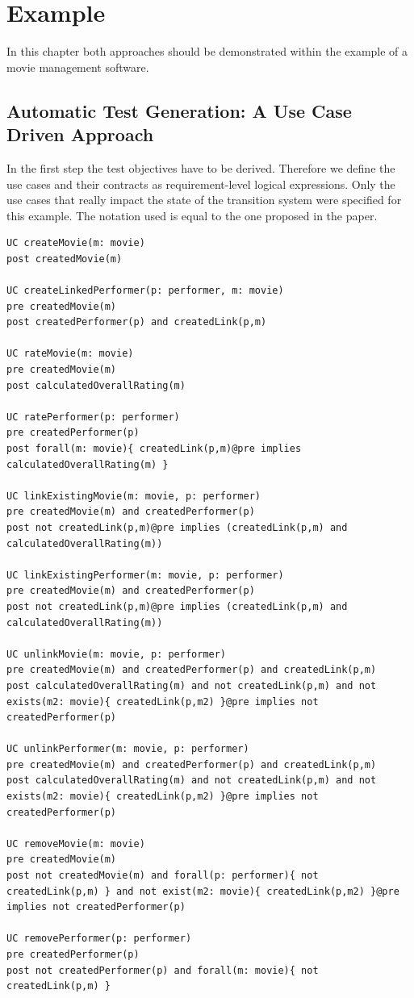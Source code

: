 \section{Example}

In this chapter both approaches should be demonstrated within the example of a movie management software.  

\subsection{Automatic Test Generation: A Use Case Driven Approach}

In the first step the test objectives have to be derived. Therefore we define the use cases and their contracts as requirement-level logical expressions. Only the use cases that really impact the state of the transition system were specified for this example. The notation used is equal to the one proposed in the paper. 

\begin{lstlisting}
UC createMovie(m: movie)
post createdMovie(m)

UC createLinkedPerformer(p: performer, m: movie)
pre createdMovie(m)
post createdPerformer(p) and createdLink(p,m)

UC rateMovie(m: movie)
pre createdMovie(m)
post calculatedOverallRating(m)

UC ratePerformer(p: performer)
pre createdPerformer(p)
post forall(m: movie){ createdLink(p,m)@pre implies calculatedOverallRating(m) }

UC linkExistingMovie(m: movie, p: performer)
pre createdMovie(m) and createdPerformer(p)
post not createdLink(p,m)@pre implies (createdLink(p,m) and calculatedOverallRating(m))

UC linkExistingPerformer(m: movie, p: performer)
pre createdMovie(m) and createdPerformer(p)
post not createdLink(p,m)@pre implies (createdLink(p,m) and calculatedOverallRating(m))

UC unlinkMovie(m: movie, p: performer)
pre createdMovie(m) and createdPerformer(p) and createdLink(p,m)
post calculatedOverallRating(m) and not createdLink(p,m) and not exists(m2: movie){ createdLink(p,m2) }@pre implies not createdPerformer(p)

UC unlinkPerformer(m: movie, p: performer)
pre createdMovie(m) and createdPerformer(p) and createdLink(p,m)
post calculatedOverallRating(m) and not createdLink(p,m) and not exists(m2: movie){ createdLink(p,m2) }@pre implies not createdPerformer(p)

UC removeMovie(m: movie)
pre createdMovie(m)
post not createdMovie(m) and forall(p: performer){ not createdLink(p,m) } and not exist(m2: movie){ createdLink(p,m2) }@pre implies not createdPerformer(p)

UC removePerformer(p: performer)
pre createdPerformer(p)
post not createdPerformer(p) and forall(m: movie){ not createdLink(p,m) }

\end{lstlisting}

